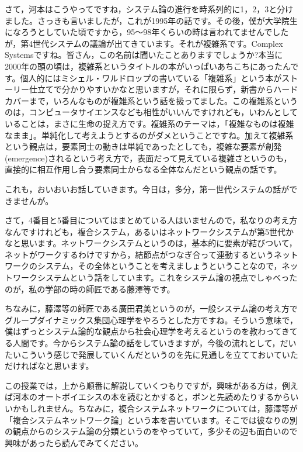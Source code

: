 \documentclass{ltjsbook}
\begin{document}
さて，河本はこうやってですね，システム論の進行を時系列的に1，2，3と分けました。さっきも言いましたが，これが1995年の話です。その後，僕が大学院生になろうとしていた頃ですから，95〜98年くらいの時は言われてませんでしたが，第4世代システムの議論が出てきています。それが複雑系です。Complex Systemsですね。皆さん，この名前は聞いたことありますでしょうか?本当に2000年の頭の頃は，複雑系というタイトルの本がいっぱいあちこちにあったんです。個人的にはミシェル・ワルドロップの書いている「複雑系」\parencite{Waldrop}という本がストーリー仕立てで分かりやすいかなと思いますが，それに限らず，新書からハードカバーまで，いろんなものが複雑系という話を扱ってました。この複雑系というのは，コンピュータサイエンスなども相性がいいんですけれども，いわんとしていることは，まさに生命の捉え方です。複雑系のテーマは，「複雑なものは複雑なまま」。単純化して考えようとするのがダメということですね。加えて複雑系という観点は，要素同士の動きは単純であったとしても，複雑な要素が創発(emergence)されるという考え方で，表面だって見えている複雑さというのも，直接的に相互作用し合う要素同士からなる全体なんだという観点の話です。

これも，おいおいお話していきます。今日は，多分，第一世代システムの話ができませんが。

さて，4番目と5番目についてはまとめている人はいませんので，私なりの考え方なんですけれども，複合システム，あるいはネットワークシステムが第5世代かなと思います。ネットワークシステムというのは，基本的に要素が結びついて，ネットがワークするわけですから，結節点がつなぎ合って連動するというネットワークのシステム，その全体ということを考えましょうということなので，ネットワークシステムという話をしています。これをシステム論の視点でしゃべったのが，私の学部の時の師匠である藤澤等です。

ちなみに，藤澤等の師匠である廣田君美というのが，一般システム論の考え方でグループダイナミックス集団心理学をやろうとした方ですね。そういう意味で，僕はずっとシステム論的な観点から社会心理学を考えるというのを教わってきてる人間です。今からシステム論の話をしていきますが，今後の流れとして，だいたいこういう感じで発展していくんだというのを先に見通しを立てておいていただければなと思います。

この授業では，上から順番に解説していくつもりですが，興味がある方は，例えば河本のオートポイエシスの本\parencite{KawamotoHideo}を読むとかすると，ポンと先読めたりするからいいかもしれません。ちなみに，複合システムネットワークについては，藤澤等が「複合システムネットワーク論」\parencite{fujisawaNetwork}という本を書いています。そこでは彼なりの別の観点からのシステム論の分類というのをやっていて，多少その辺も面白いので興味があったら読んでみてください。
\end{document}
